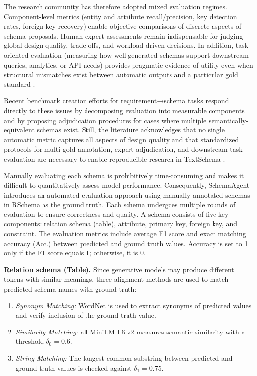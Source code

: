 The research community has therefore adopted mixed evaluation regimes. Component-level metrics (entity and attribute recall/precision, key detection rates, foreign-key recovery) enable objective comparisons of discrete aspects of schema proposals. Human expert assessments remain indispensable for judging global design quality, trade-offs, and workload-driven decisions. In addition, task-oriented evaluation (measuring how well generated schemas support downstream queries, analytics, or API needs) provides pragmatic evidence of utility even when structural mismatches exist between automatic outputs and a particular gold standard \cite{schemaagent2025,abedjan2016,yu2018spider}.

Recent benchmark creation efforts for requirement→schema tasks respond directly to these issues by decomposing evaluation into measurable components and by proposing adjudication procedures for cases where multiple semantically-equivalent schemas exist. Still, the literature acknowledges that no single automatic metric captures all aspects of design quality and that standardized protocols for multi-gold annotation, expert adjudication, and downstream task evaluation are necessary to enable reproducible research in Text\textrightarrow Schema \cite{schemaagent2025}.

Manually evaluating each schema is prohibitively time-consuming and makes it difficult to quantitatively assess model performance. Consequently, SchemaAgent introduces an automated evaluation approach using manually annotated schemas in RSchema as the ground truth. Each schema undergoes multiple rounds of evaluation to ensure correctness and quality. A schema consists of five key components: relation schema (table), attribute, primary key, foreign key, and constraint. The evaluation metrics include average F1 score and exact matching accuracy (Acc.) between predicted and ground truth values. Accuracy is set to 1 only if the F1 score equals 1; otherwise, it is 0.

\textbf{Relation schema (Table).} Since generative models may produce different tokens with similar meanings, three alignment methods are used to match predicted schema names with ground truth:
\begin{enumerate}
    \item \emph{Synonym Matching:} WordNet is used to extract synonyms of predicted values and verify inclusion of the ground-truth value.
    \item \emph{Similarity Matching:} all-MiniLM-L6-v2 measures semantic similarity with a threshold $\delta_0 = 0.6$.
    \item \emph{String Matching:} The longest common substring between predicted and ground-truth values is checked against $\delta_1 = 0.75$.
\end{enumerate}

